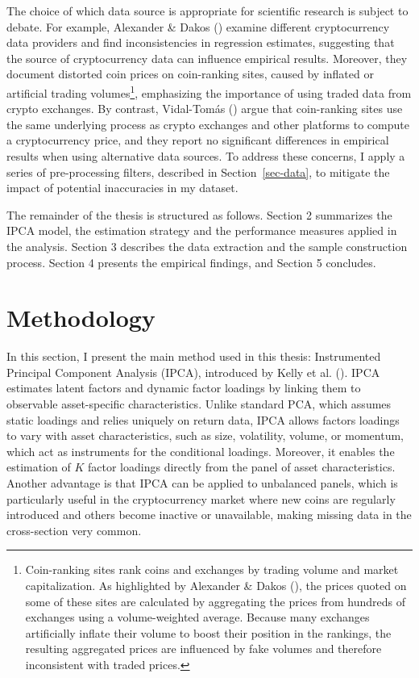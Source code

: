 \documentclass[
  12pt,
  a4paper,
  openany]{scrbook}
\begin{document}
The choice of which data source is appropriate for scientific research
is subject to debate. For example, Alexander \& Dakos
() examine
different cryptocurrency data providers and find inconsistencies in
regression estimates, suggesting that the source of cryptocurrency data
can influence empirical results. Moreover, they document distorted coin
prices on coin-ranking sites, caused by inflated or artificial trading
volumes\footnote{Coin-ranking sites rank coins and exchanges by trading
  volume and market capitalization. As highlighted by Alexander \& Dakos
  (), the prices
  quoted on some of these sites are calculated by aggregating the prices
  from hundreds of exchanges using a volume-weighted average. Because
  many exchanges artificially inflate their volume to boost their
  position in the rankings, the resulting aggregated prices are
  influenced by fake volumes and therefore inconsistent with traded
  prices.}, emphasizing the importance of using traded data from crypto
exchanges. By contrast, Vidal-Tomás
() argue that
coin-ranking sites use the same underlying process as crypto exchanges
and other platforms to compute a cryptocurrency price, and they report
no significant differences in empirical results when using alternative
data sources. To address these concerns, I apply a series of
pre-processing filters, described in Section~\ref{sec-data}, to mitigate
the impact of potential inaccuracies in my dataset.

The remainder of the thesis is structured as follows. Section 2
summarizes the IPCA model, the estimation strategy and the performance
measures applied in the analysis. Section 3 describes the data
extraction and the sample construction process. Section 4 presents the
empirical findings, and Section 5 concludes.


\chapter{Methodology}\label{sec-methodology}

In this section, I present the main method used in this thesis:
Instrumented Principal Component Analysis (IPCA), introduced by Kelly et
al. (). IPCA estimates
latent factors and dynamic factor loadings by linking them to observable
asset-specific characteristics. Unlike standard PCA, which assumes
static loadings and relies uniquely on return data, IPCA allows factors
loadings to vary with asset characteristics, such as size, volatility,
volume, or momentum, which act as instruments for the conditional
loadings. Moreover, it enables the estimation of \(K\) factor loadings
directly from the panel of asset characteristics. Another advantage is
that IPCA can be applied to unbalanced panels, which is particularly
useful in the cryptocurrency market where new coins are regularly
introduced and others become inactive or unavailable, making missing
data in the cross-section very common.
\end{document}
